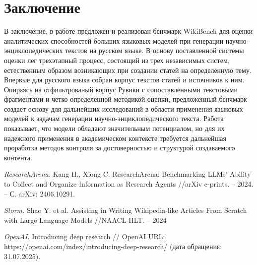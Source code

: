 \documentclass{article}
\theoremstyle{definition}
\theoremstyle{plain}
\begin{document}
\section*{Заключение}
В заключение, в работе предложен и реализован бенчмарк WikiBench для оценки аналитических способностей больших языковых моделей при генерации научно-энциклопедических текстов на русском языке.
В основу поставленной системы оценки лег трехэтапный процесс, состоящий из трех независимых систем, естественным образом возникающих при создании статей на определенную тему.
Впервые для русского языка собран корпус текстов статей и источников к ним. Опираясь на отфильтрованый корпус Рувики с сопоставленными текстовыми фрагментами и четко определенной методикой оценки, 
предложенный бенчмарк создает основу для дальнейших исследований в области применения языковых моделей к задачам генерации научно-энциклопедического текста. Работа показывает, что модели обладают значительным потенциалом, 
но для их надежного применения в академическом контексте требуется дальнейшая проработка методов контроля за достоверностью и структурой создаваемого контента.


\begin{thebibliography}{99}

\textit{ResearchArena.}
Kang H., Xiong C. ResearchArena: Benchmarking LLMs' Ability to Collect and Organize Information as Research Agents //arXiv e-prints. – 2024. – С. arXiv: 2406.10291.

\textit{Storm.}
Shao Y. et al. Assisting in Writing Wikipedia-like Articles From Scratch with Large Language Models //NAACL-HLT. – 2024

\textit{OpenAI.}
Introducing deep research // OpenAI URL: https://openai.com/index/introducing-deep-research/ (дата обращения: 31.07.2025).

\end{thebibliography}

\renewcommand\refname{References}
\end{document}
